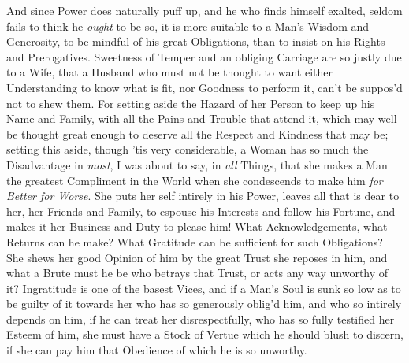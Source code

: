 And since Power does naturally puff up, and he who finds himself
exalted, seldom fails to think he \textit{ought} to be so, it is more
suitable to a Man's Wisdom  and Generosity, to be mindful of
his great Obligations, than to insist on his Rights and Prerogatives.
Sweetness of Temper and an obliging Carriage are so justly due to a
Wife, that a Husband who must not be thought to want either
Understanding to know what is fit, nor Goodness to perform it, can't
be suppos'd not to shew them. For setting aside the Hazard of her
Person to keep up his Name and Family, with all the Pains and Trouble
that attend it, which may well be thought great enough to deserve all
the Respect and Kindness that may be; setting this aside, though 'tis
very considerable, a Woman has so much the Disadvantage in
\textit{most}, I was about to say, in \textit{all} Things, that she
makes a Man the greatest Compliment in the World when she condescends
to make him \textit{for Better for Worse}. She puts her self intirely
in his Power, leaves all that is dear to her, her Friends and Family,
to espouse his Interests and follow his Fortune, and makes it her
Business and Duty to please him! What Acknowledgements,  what
Returns can he make? What Gratitude can be sufficient for such
Obligations? She shews her good Opinion of him by the great Trust she
reposes in him, and what a Brute must he be who betrays that Trust, or
acts any way unworthy of it? Ingratitude is one of the basest Vices,
and if a Man's Soul is sunk so low as to be guilty of it towards her
who has so generously oblig'd him, and who so intirely depends on him,
if he can treat her disrespectfully, who has so fully testified her
Esteem of him, she must have a Stock of Vertue which he should blush
to discern, if she can pay him that Obedience of which he is so
unworthy.


